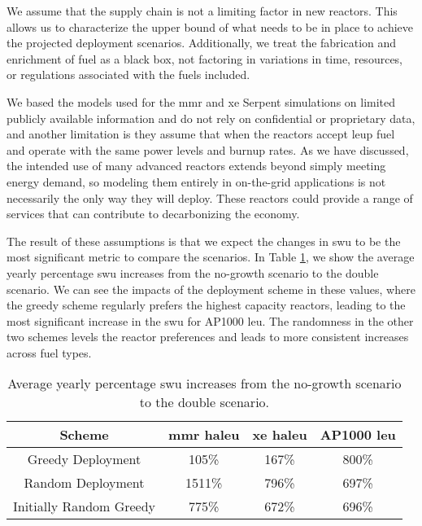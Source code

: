 We assume that the supply chain is not a limiting factor in new reactors. This allows us to characterize the upper bound of what needs to be in place to achieve the projected deployment scenarios. Additionally, we treat the fabrication and enrichment of fuel as a black box, not factoring in variations in time, resources, or regulations associated with the fuels included.

We based the models used for the \gls{mmr} and \gls{xe} Serpent simulations on limited publicly available information and do not rely on confidential or proprietary data, and another limitation is they assume that when the reactors accept \gls{leup} fuel and operate with the same power levels and burnup rates. As we have discussed, the intended use of many advanced reactors extends beyond simply meeting energy demand, so modeling them entirely in on-the-grid applications is not necessarily the only way they will deploy. These reactors could provide a range of services that can contribute to decarbonizing the economy.

The result of these assumptions is that we expect the changes in \gls{swu} to be the most significant metric to compare the scenarios. In Table \ref{tab:swu_incs}, we show the average yearly percentage \gls{swu} increases from the no-growth scenario to the double scenario. We can see the impacts of the deployment scheme in these values, where the greedy scheme regularly prefers the highest capacity reactors, leading to the most significant increase in the \gls{swu} for AP1000 \gls{leu}. The randomness in the other two schemes levels the reactor preferences and leads to more consistent increases across fuel types.

\begin{table}[H]
    \centering
    \caption{Average yearly percentage \gls{swu} increases from the no-growth scenario to the double scenario.}
    \label{tab:swu_incs}
    \begin{tabular}{c c c c}
        \hline
        Scheme & \gls{mmr} \gls{haleu} & \gls{xe} \gls{haleu} & AP1000 \gls{leu}\\
        \hline
        Greedy Deployment & 105\% & 167\% & 800\% \\
        Random Deployment & 1511\% & 796\% & 697\% \\
        Initially Random Greedy & 775\% & 672\% & 696\% \\
        \hline
    \end{tabular}
\end{table}

